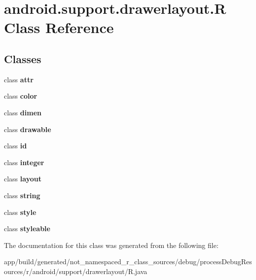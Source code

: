 \hypertarget{classandroid_1_1support_1_1drawerlayout_1_1_r}{}\section{android.\+support.\+drawerlayout.\+R Class Reference}
\label{classandroid_1_1support_1_1drawerlayout_1_1_r}
\subsection*{Classes}
\begin{DoxyCompactItemize}
\item 
class {\bfseries attr}
\item 
class {\bfseries color}
\item 
class {\bfseries dimen}
\item 
class {\bfseries drawable}
\item 
class {\bfseries id}
\item 
class {\bfseries integer}
\item 
class {\bfseries layout}
\item 
class {\bfseries string}
\item 
class {\bfseries style}
\item 
class {\bfseries styleable}
\end{DoxyCompactItemize}


The documentation for this class was generated from the following file\+:\begin{DoxyCompactItemize}
\item 
app/build/generated/not\+\_\+namespaced\+\_\+r\+\_\+class\+\_\+sources/debug/process\+Debug\+Resources/r/android/support/drawerlayout/R.\+java\end{DoxyCompactItemize}
